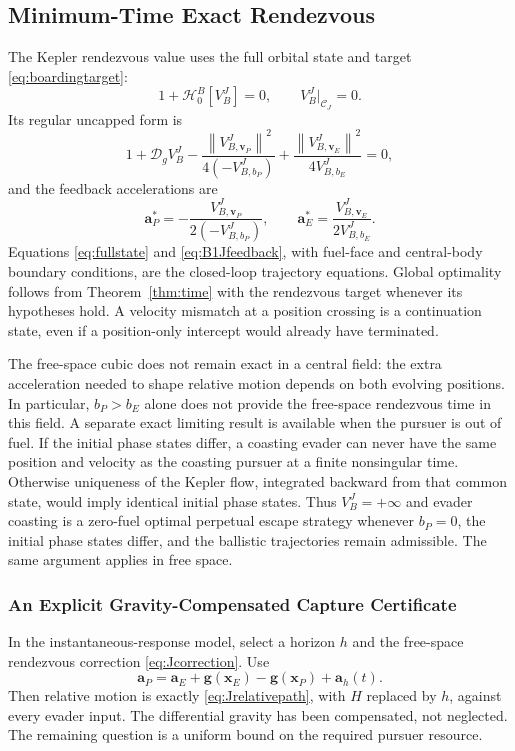 \documentclass[journal,a4paper]{IEEEtran}
\newcommand{\C}{\mathcal C}
\newcommand{\D}{\mathcal D}
\newcommand{\HH}{\mathcal H}
\newcommand{\norm}[1]{\left\|#1\right\|}
\begin{document}
\subsection{Minimum-Time Exact Rendezvous}
\label{sec:keplerboarding}
The Kepler rendezvous value uses the full orbital state and target \eqref{eq:boardingtarget}:
\begin{equation}
 \boxed{1+\HH^B_0[V_B^J]=0,\qquad V_B^J|_{\C_J}=0.}
 \label{eq:B1J}
\end{equation}
Its regular uncapped form is
\begin{equation}
 1+\D_g V_B^J
 -\frac{\norm{V^J_{B,\mathbf v_P}}^2}{4(-V^J_{B,b_P})}
 +\frac{\norm{V^J_{B,\mathbf v_E}}^2}{4V^J_{B,b_E}}=0,
 \label{eq:B1Jexpanded}
\end{equation}
and the feedback accelerations are
\begin{equation}
 \mathbf a_P^*=-\frac{V^J_{B,\mathbf v_P}}{2(-V^J_{B,b_P})},\qquad
 \mathbf a_E^*=\frac{V^J_{B,\mathbf v_E}}{2V^J_{B,b_E}}.
 \label{eq:B1Jfeedback}
\end{equation}
Equations \eqref{eq:fullstate} and \eqref{eq:B1Jfeedback}, with fuel-face and central-body boundary conditions, are the closed-loop trajectory equations. Global optimality follows from Theorem~\ref{thm:time} with the rendezvous target whenever its hypotheses hold. A velocity mismatch at a position crossing is a continuation state, even if a position-only intercept would already have terminated.

The free-space cubic does not remain exact in a central field: the extra acceleration needed to shape relative motion depends on both evolving positions. In particular, $b_P>b_E$ alone does not provide the free-space rendezvous time in this field. A separate exact limiting result is available when the pursuer is out of fuel. If the initial phase states differ, a coasting evader can never have the same position and velocity as the coasting pursuer at a finite nonsingular time. Otherwise uniqueness of the Kepler flow, integrated backward from that common state, would imply identical initial phase states. Thus $V_B^J=+\infty$ and evader coasting is a zero-fuel optimal perpetual escape strategy whenever $b_P=0$, the initial phase states differ, and the ballistic trajectories remain admissible. The same argument applies in free space.

\subsubsection{An Explicit Gravity-Compensated Capture Certificate}
In the instantaneous-response model, select a horizon $h$ and the free-space rendezvous correction \eqref{eq:Jcorrection}. Use
\begin{equation}
 \boxed{\mathbf a_P=\mathbf a_E+
       \mathbf g(\mathbf x_E)-\mathbf g(\mathbf x_P)+\mathbf a_h(t).}
 \label{eq:gravitycompensation}
\end{equation}
Then relative motion is exactly \eqref{eq:Jrelativepath}, with $H$ replaced by $h$, against every evader input. The differential gravity has been compensated, not neglected. The remaining question is a uniform bound on the required pursuer resource.
\end{document}
